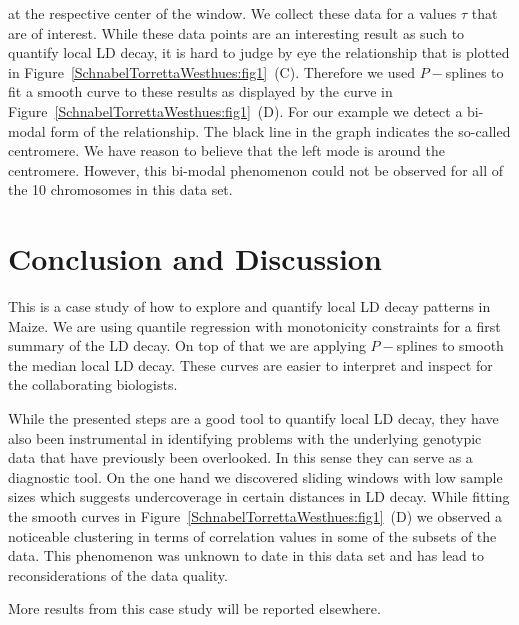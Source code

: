 \documentclass[twoside]{report}
\begin{document}
	at the respective center of the window. We collect these data for a 
	values $\tau$ that are of interest. While these data points are an interesting result as
	such to quantify local LD decay, it is hard to judge by eye the relationship that is plotted in 
	Figure~\ref{SchnabelTorrettaWesthues:fig1}~(C). 
	Therefore we used $P-$splines to fit a smooth curve to these results as 
	displayed by the curve in Figure~\ref{SchnabelTorrettaWesthues:fig1}~(D). 
	For our example we detect a bi-modal form of the 
	relationship. The black line in the graph indicates the so-called centromere. 
	We have reason to believe that the left mode is around the centromere.   
	However, this bi-modal phenomenon could not be observed for 
	all of the 10 chromosomes in this data set.   

\section{Conclusion and Discussion}
This is a case study of how to explore and quantify local LD decay patterns in Maize. We are using
quantile regression with monotonicity constraints for a first summary of the LD decay. 
On top of that we are applying $P-$splines to smooth the median local LD decay. These curves 
are easier to interpret and inspect for the collaborating biologists. 

While the presented steps are a good tool to quantify local LD decay, they have also been 
	instrumental in identifying problems with the underlying genotypic 
	data that have previously been 
	overlooked. In this sense they can serve as a diagnostic tool. 
	On the one hand we discovered sliding windows with low sample sizes which suggests 
	undercoverage in certain distances in LD decay. 
	While fitting the smooth curves in Figure~\ref{SchnabelTorrettaWesthues:fig1}~(D) we 
	observed a noticeable clustering 
	in terms of correlation values in some of the subsets of the data. This phenomenon was unknown 
	to date in this data set and has lead to reconsiderations of the data quality. 
	
More results from this case study will be reported elsewhere.
\end{document}
